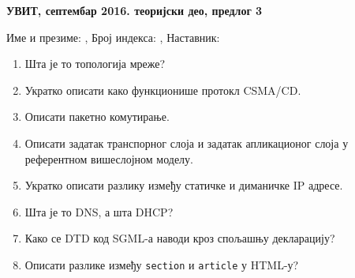 \documentclass[a4paper]{article}
\begin{document}
\begin{center}
\textbf{УВИТ, септембар 2016. теоријски део, предлог 3}  
\end{center}
Име и презиме: \hrulefill, Број индекса: \hrulefill, Наставник: \hrulefill
\begin{enumerate}

\item Шта је то топологија мреже?

\hrulefill

\hrulefill

\hrulefill

\item Укратко описати како функционише протокл CSMA/CD. 

\hrulefill

\hrulefill

\hrulefill

\item Описати пакетно комутирање.

\hrulefill

\hrulefill

\hrulefill

\item Описати задатак транспорног слоја и задатак апликационог слоја у референтном вишеслојном моделу.

\hrulefill

\hrulefill

\hrulefill

\item Укратко описати разлику између статичке и диманичке IP адресе.

\hrulefill

\hrulefill

\hrulefill

\item Шта је то DNS, а шта DHCP?

\hrulefill

\hrulefill

\hrulefill

\item Како се DTD код SGML-а наводи кроз спољашњу декларацију?

\hrulefill

\hrulefill

\hrulefill

\item Описати разлике између \verb|section| и \verb|article| у HTML-у?

\hrulefill


\end{enumerate}
\end{document}
